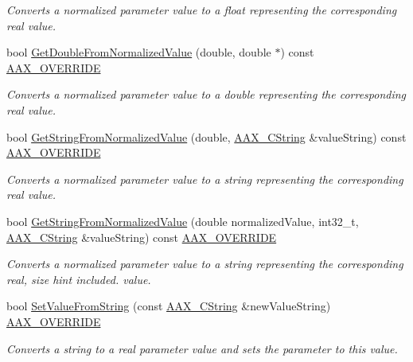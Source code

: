 \begin{Indent}
\begin{DoxyCompactItemize}
\begin{DoxyCompactList}\small\item\em Converts a normalized parameter value to a float representing the corresponding real value. \end{DoxyCompactList}\item 
bool \mbox{\hyperlink{a01541_a9b42c8f89ca9971e8dfd8598d0eba92d}{Get\+Double\+From\+Normalized\+Value}} (double, double $\ast$) const \mbox{\hyperlink{a00392_ac2f24a5172689ae684344abdcce55463}{A\+A\+X\+\_\+\+O\+V\+E\+R\+R\+I\+DE}}
\begin{DoxyCompactList}\small\item\em Converts a normalized parameter value to a double representing the corresponding real value. \end{DoxyCompactList}\item 
bool \mbox{\hyperlink{a01541_a1c43b945b7953fbfceb1c2f9905178de}{Get\+String\+From\+Normalized\+Value}} (double, \mbox{\hyperlink{a01573}{A\+A\+X\+\_\+\+C\+String}} \&value\+String) const \mbox{\hyperlink{a00392_ac2f24a5172689ae684344abdcce55463}{A\+A\+X\+\_\+\+O\+V\+E\+R\+R\+I\+DE}}
\begin{DoxyCompactList}\small\item\em Converts a normalized parameter value to a string representing the corresponding real value. \end{DoxyCompactList}\item 
bool \mbox{\hyperlink{a01541_a8d9c9e41b267a58234ad49e136f913b1}{Get\+String\+From\+Normalized\+Value}} (double normalized\+Value, int32\+\_\+t, \mbox{\hyperlink{a01573}{A\+A\+X\+\_\+\+C\+String}} \&value\+String) const \mbox{\hyperlink{a00392_ac2f24a5172689ae684344abdcce55463}{A\+A\+X\+\_\+\+O\+V\+E\+R\+R\+I\+DE}}
\begin{DoxyCompactList}\small\item\em Converts a normalized parameter value to a string representing the corresponding real, size hint included. value. \end{DoxyCompactList}\item 
bool \mbox{\hyperlink{a01541_aac043ee3e4813c57b864c07ca60de2c9}{Set\+Value\+From\+String}} (const \mbox{\hyperlink{a01573}{A\+A\+X\+\_\+\+C\+String}} \&new\+Value\+String) \mbox{\hyperlink{a00392_ac2f24a5172689ae684344abdcce55463}{A\+A\+X\+\_\+\+O\+V\+E\+R\+R\+I\+DE}}
\begin{DoxyCompactList}\small\item\em Converts a string to a real parameter value and sets the parameter to this value. \end{DoxyCompactList}\end{DoxyCompactItemize}
\end{Indent}
